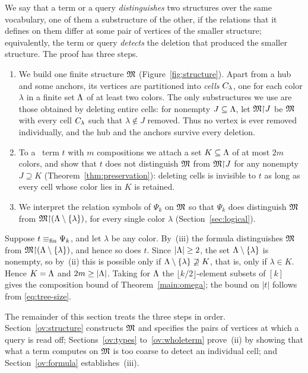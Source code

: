 We say that a term or a query \emph{distinguishes} two structures over the
same vocabulary, one of them a substructure of the other, if the relations
that it defines on them differ at some pair of vertices of the smaller
structure; equivalently, the term or query \emph{detects} the deletion that
produced the smaller structure. The proof has three steps.
\begin{enumerate}[nosep,label=(\roman*)]
\item We build one finite structure $\mathfrak M$ (Figure~\ref{fig:structure}).
 Apart from a hub and some anchors, its vertices are partitioned into
 \emph{cells} $C_{\lambda}$, one for each color $\lambda$ in a finite set
 $\Lambda$ of at least two colors. The only substructures we use are those
 obtained by deleting entire cells: for nonempty $J\subseteq\Lambda$, let
 $\mathfrak M\mathord{\restriction} J$ be $\mathfrak M$ with every cell $C_{\lambda}$ such that
 $\lambda\notin J$ removed. Thus no vertex is ever removed individually,
 and the hub and the anchors survive every deletion.
\item To a \CoR\ term $t$ with $m$ compositions we attach a set
 $K\subseteq\Lambda$ of at most $2m$ colors, and show that $t$ does not
 distinguish $\mathfrak M$ from $\mathfrak M\mathord{\restriction} J$ for any nonempty $J\supseteq K$
 (Theorem~\ref{thm:preservation}): deleting cells is invisible to $t$ as
 long as every cell whose color lies in $K$ is retained.
\item We interpret the relation symbols of $\Psi_k$ on $\mathfrak M$ so that
 $\Psi_k$ does distinguish $\mathfrak M$ from $\mathfrak M\mathord{\restriction}(\Lambda\setminus\{\lambda\})$, for
 every single color $\lambda$ (Section~\ref{sec:logical}).
\end{enumerate}
Suppose $t\equiv_{\rm fin}\Psi_k$, and let $\lambda$ be any color. By~(iii)
the formula distinguishes $\mathfrak M$ from $\mathfrak M\mathord{\restriction}(\Lambda\setminus\{\lambda\})$, and
hence so does $t$. Since $|\Lambda|\ge2$, the set $\Lambda\setminus\{\lambda\}$ is
nonempty, so by~(ii) this is possible only if
$\Lambda\setminus\{\lambda\}\not\supseteq K$, that is, only if $\lambda\in K$.
Hence $K=\Lambda$ and $2m\ge|\Lambda|$. Taking for $\Lambda$ the $\lfloor
k/2\rfloor$-element subsets of $[k]$ gives the composition bound of
Theorem~\ref{main:omega}; the bound on $|t|$ follows from
\eqref{eq:tree-size}.

The remainder of this section treats the three steps in order.
Section~\ref{ov:structure} constructs $\mathfrak M$ and specifies the pairs of
vertices at which a query is read off; Sections~\ref{ov:types}
to~\ref{ov:wholeterm} prove~(ii) by showing that what a term computes on
$\mathfrak M$ is too coarse to detect an individual cell; and
Section~\ref{ov:formula} establishes~(iii).

